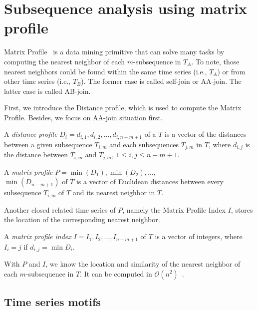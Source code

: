 \section{Subsequence analysis using matrix profile} \label{sec:mp} %

Matrix Profile~\cite{zhu2020swiss} is a data mining primitive that can solve many tasks by computing the nearest neighbor of each $m$-subsequence in $T_A$. To note, those nearest neighbors could be found within the same time series (i.e., $T_A$) or from other time series (i.e., $T_B$). 
The former case is called self-join or AA-join. The latter case is called AB-join.

First, we introduce the Distance profile, which is used to compute the Matrix Profile.
Besides, we focus on AA-join situation first.

\begin{definition}
    A \textit{distance profile} $D_i = d_{i, 1}, d_{i, 2}, \dots, d_{i, n-m+1}$ of a $T$ is a vector of the distances between a given subsequence $T_{i, m}$ and each subsequences $T_{j, m}$ in $T$, where $d_{i, j}$ is the distance between $T_{i, m}$ and $T_{j, m}$, $1 \leq i, j \leq n-m+1$.
\end{definition}

\begin{definition}
    A \textit{matrix profile} $P = \min(D_1), \min(D_2), \dots, $\\$\min(D_{n-m+1})$ of $T$ is a vector of Euclidean distances between every subsequence $T_{i, m}$ of $T$ and its nearest neighbor in $T$.
\end{definition}

Another closed related time series of $P$, namely the Matrix Profile Index $I$, stores the location of the corresponding nearest neighbor.

\begin{definition}
    A \textit{matrix profile index} $I = I_1, I_2, \dots, I_{n-m+1}$ of $T$ is a vector of integers, where $I_i = j$ if $d_{i, j} = \min{D_i}$.
\end{definition}

With $P$ and $I$, we know the location and similarity of the nearest neighbor of each $m$-subsequence in $T$.
It can be computed in $\mathcal{O}(n^2)$~\cite{zhu2016matrix, zhong2024mass}.

\subsection{Time series motifs} %

